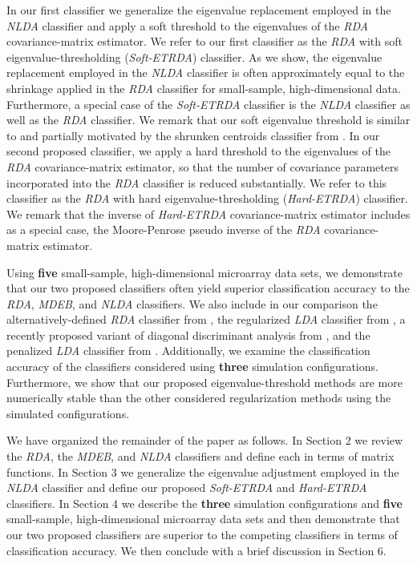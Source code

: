 \documentclass[11pt]{article}
\begin{document}
In our first classifier we generalize the eigenvalue replacement employed in the \emph{NLDA} classifier and apply a soft threshold to the eigenvalues of the \emph{RDA} covariance-matrix estimator. We refer to our first classifier as the \emph{RDA} with soft eigenvalue-thresholding (\emph{Soft-ETRDA}) classifier.  As we show, the eigenvalue replacement employed in the \emph{NLDA} classifier is often approximately equal to the shrinkage applied in the \emph{RDA} classifier for small-sample, high-dimensional data. Furthermore, a special case of the \emph{Soft-ETRDA} classifier is the \emph{NLDA} classifier as well as the \emph{RDA} classifier.  We remark that our soft eigenvalue threshold is similar to and partially motivated by the shrunken centroids classifier from \cite*{Tibshirani:2002ht}. 	In our second proposed classifier, we apply a hard threshold to the eigenvalues of the \emph{RDA} covariance-matrix estimator, so that the number of covariance parameters incorporated into the \emph{RDA} classifier is reduced substantially. We refer to this classifier as the \emph{RDA} with hard eigenvalue-thresholding (\emph{Hard-ETRDA}) classifier. We remark that the inverse of \emph{Hard-ETRDA} covariance-matrix estimator includes as a special case, the Moore-Penrose pseudo inverse of the \emph{RDA} covariance-matrix estimator.

Using \textbf{five} small-sample, high-dimensional microarray data sets, we demonstrate that our two proposed classifiers often yield superior classification accuracy to the \emph{RDA}, \emph{MDEB}, and \emph{NLDA} classifiers. We also include in our comparison the alternatively-defined \emph{RDA} classifier from \cite*{Hastie:2008dt}, the regularized \emph{LDA} classifier from \cite{Guo:2007te}, a recently proposed variant of diagonal discriminant analysis from \cite*{Tong:2012hw}, and the penalized \emph{LDA} classifier from \cite{Witten:2011kc}. Additionally, we examine the classification accuracy of the classifiers considered using \textbf{three} simulation configurations. Furthermore, we show that our proposed eigenvalue-threshold methods are more numerically stable than the other considered regularization methods using the simulated configurations.

We have organized the remainder of the paper as follows. In Section 2 we review the \emph{RDA}, the \emph{MDEB}, and \emph{NLDA} classifiers and define each in terms of matrix functions. In Section 3 we generalize the eigenvalue adjustment employed in the \emph{NLDA} classifier and define our proposed \emph{Soft-ETRDA} and \emph{Hard-ETRDA} classifiers. In Section 4 we describe the \textbf{three} simulation configurations and \textbf{five} small-sample, high-dimensional microarray data sets and then demonstrate that our two proposed classifiers are superior to the competing classifiers in terms of classification accuracy. We then conclude with a brief discussion in Section 6.
\end{document}
